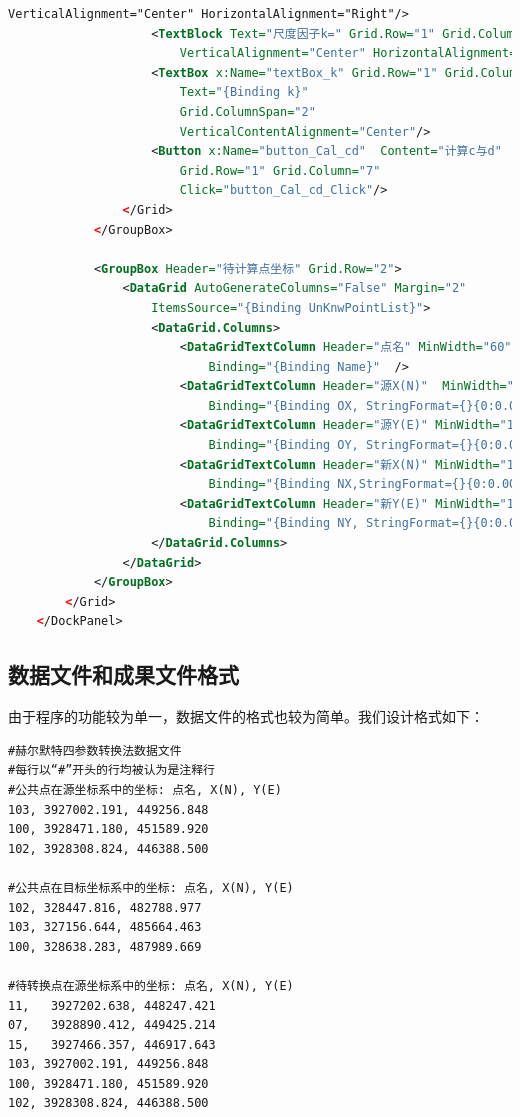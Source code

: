 \begin{lstlisting}[language=xml]
                        VerticalAlignment="Center" HorizontalAlignment="Right"/>
                    <TextBlock Text="尺度因子k=" Grid.Row="1" Grid.Column="4" 
                        VerticalAlignment="Center" HorizontalAlignment="Right"/>
                    <TextBox x:Name="textBox_k" Grid.Row="1" Grid.Column="5" 
                        Text="{Binding k}" 
                        Grid.ColumnSpan="2"
                        VerticalContentAlignment="Center"/>
                    <Button x:Name="button_Cal_cd"  Content="计算c与d"
                        Grid.Row="1" Grid.Column="7" 
                        Click="button_Cal_cd_Click"/>
                </Grid>
            </GroupBox>

            <GroupBox Header="待计算点坐标" Grid.Row="2">
                <DataGrid AutoGenerateColumns="False" Margin="2" 
                    ItemsSource="{Binding UnKnwPointList}">
                    <DataGrid.Columns>
                        <DataGridTextColumn Header="点名" MinWidth="60"
                            Binding="{Binding Name}"  />
                        <DataGridTextColumn Header="源X(N)"  MinWidth="100"
                            Binding="{Binding OX, StringFormat={}{0:0.000}}"/>
                        <DataGridTextColumn Header="源Y(E)" MinWidth="100"
                            Binding="{Binding OY, StringFormat={}{0:0.000}}"/>
                        <DataGridTextColumn Header="新X(N)" MinWidth="100"
                            Binding="{Binding NX,StringFormat={}{0:0.000}}" />
                        <DataGridTextColumn Header="新Y(E)" MinWidth="100"
                            Binding="{Binding NY, StringFormat={}{0:0.000}}" />
                    </DataGrid.Columns>
                </DataGrid>
            </GroupBox>
        </Grid>
    </DockPanel>
\end{lstlisting}

\subsection{数据文件和成果文件格式}
由于程序的功能较为单一，数据文件的格式也较为简单。我们设计格式如下：
\begin{verbatim}
#赫尔默特四参数转换法数据文件
#每行以“#”开头的行均被认为是注释行
#公共点在源坐标系中的坐标: 点名, X(N), Y(E)
103, 3927002.191, 449256.848
100, 3928471.180, 451589.920
102, 3928308.824, 446388.500

#公共点在目标坐标系中的坐标: 点名, X(N), Y(E)
102, 328447.816, 482788.977
103, 327156.644, 485664.463
100, 328638.283, 487989.669

#待转换点在源坐标系中的坐标: 点名, X(N), Y(E)
11,   3927202.638, 448247.421
07,   3928890.412, 449425.214
15,   3927466.357, 446917.643
103, 3927002.191, 449256.848
100, 3928471.180, 451589.920
102, 3928308.824, 446388.500
\end{verbatim}

